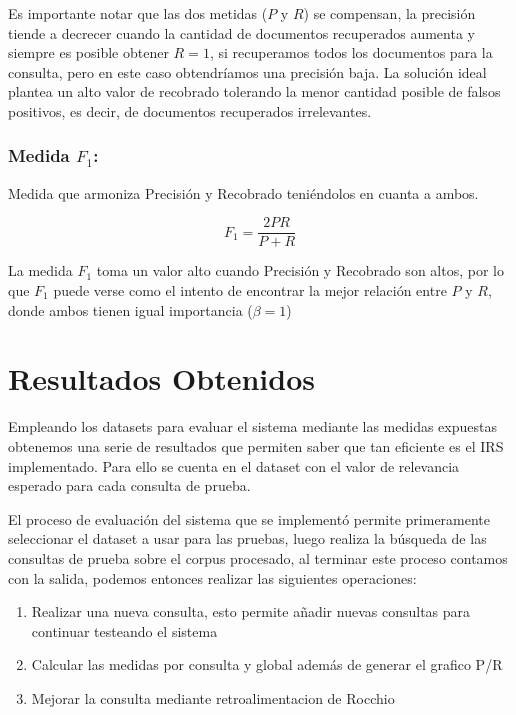\documentclass[runningheads,a4paper]{llncs}
\begin{document}
Es importante notar que las dos metidas ($P$ y $R$) se compensan, la precisión tiende a decrecer cuando la cantidad
de documentos recuperados aumenta y siempre es posible obtener $R = 1$, si recuperamos todos los documentos para la consulta, pero en este caso obtendríamos una precisión baja. La solución ideal plantea un alto valor de recobrado tolerando la menor cantidad posible de falsos positivos, es decir, de documentos recuperados irrelevantes.

\subsubsection*{Medida $F_1$:} Medida que armoniza Precisión y Recobrado teniéndolos en cuanta a ambos.

\begin{equation}
	F_1 = \frac{2 PR}{P + R}
\end{equation}

La medida $F_1$ toma un valor alto cuando Precisión y Recobrado son altos, por lo que $F_1$ puede verse como el intento de encontrar la mejor relación entre $P$ y $R$, donde ambos tienen igual importancia ($\beta = 1$)

\section{Resultados Obtenidos}

Empleando los datasets para evaluar el sistema mediante las medidas expuestas obtenemos una serie de resultados que permiten saber que tan eficiente es el IRS implementado. Para ello se cuenta en el dataset con el valor de relevancia esperado para cada consulta de prueba. 

El proceso de evaluación del sistema que se implementó permite primeramente seleccionar el dataset a usar para las pruebas, luego realiza la búsqueda de las consultas de prueba sobre el corpus procesado, al terminar este proceso contamos con la salida, podemos entonces realizar las siguientes operaciones:

\begin{enumerate}
	\item Realizar una nueva consulta, esto permite añadir nuevas consultas para continuar testeando el sistema
	\item Calcular las medidas por consulta y global además de generar el grafico P/R 
	\item Mejorar la consulta mediante retroalimentacion de Rocchio
\end{enumerate}
\end{document}
